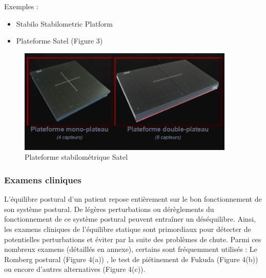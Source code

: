 Exemples : 
\begin{itemize}
    
    \item Stabilo Stabilometric Platform 
    \item Plateforme  Satel (Figure 3)
\end{itemize}

\begin{figure}[ht]
    \centering
    \includegraphics[height=5cm]{images/pression_plantaire/satel.png}
    \caption{Plateforme stabilométrique Satel}\label{fig:satel}
\end{figure}

\subsubsection{Examens cliniques}

L’équilibre postural d’un patient repose entièrement sur le bon fonctionnement de 
son système postural. De légères perturbations ou dérèglements du fonctionnement 
de ce système postural peuvent  entraîner un déséquilibre. Ainsi, les examens 
cliniques de l’équilibre statique sont primordiaux pour détecter de potentielles 
perturbations et éviter par la suite des problèmes de chute.  Parmi ces nombreux 
examens (détaillés en annexe), certains sont fréquemment utilisés : Le Romberg 
postural (Figure 4(a)) , le test de piétinement de Fukuda (Figure 4(b)) ou encore 
d’autres alternatives (Figure 4(c)). 



